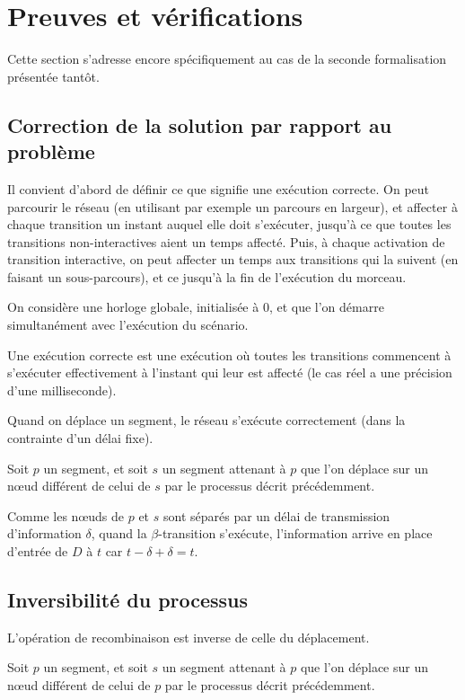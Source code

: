\section{Preuves et vérifications}
Cette section s'adresse encore spécifiquement au cas de la seconde formalisation présentée tantôt.

\subsection{Correction de la solution par rapport au problème} 
Il convient d'abord de définir ce que signifie une exécution correcte.
On peut parcourir le réseau (en utilisant par exemple un parcours en largeur), et affecter à chaque transition un instant auquel elle doit s'exécuter, jusqu'à ce que toutes les transitions non-interactives aient un temps affecté. Puis, à chaque activation de transition interactive, on peut affecter un temps aux transitions qui la suivent (en faisant un sous-parcours), et ce jusqu'à la fin de l'exécution du morceau.

On considère une horloge globale, initialisée à 0, et que l'on démarre simultanément avec l'exécution du scénario.

Une exécution correcte est une exécution où toutes les transitions commencent à s'exécuter effectivement à l'instant qui leur est affecté (le cas réel a une précision d'une milliseconde).

\begin{myth}
Quand on déplace un segment, le réseau s'exécute correctement (dans la contrainte d'un délai fixe).
\end{myth}

Soit $p$ un segment, et soit $s$ un segment attenant à $p$ que l'on déplace sur un nœud différent de celui de $s$ par le processus décrit précédemment.

Comme les nœuds de $p$ et $s$ sont séparés par un délai de transmission d'information $\delta$, quand la $\beta$-transition s'exécute, l'information arrive en place d'entrée de $D$ à $t$ car $t - \delta + \delta = t$.   

\subsection{Inversibilité du processus}
\begin{myth}
	L'opération de recombinaison est inverse de celle du déplacement.
\end{myth}
Soit $p$ un segment, et soit $s$ un segment attenant à $p$ que l'on déplace sur un nœud différent de celui de $p$ par le processus décrit précédemment.

